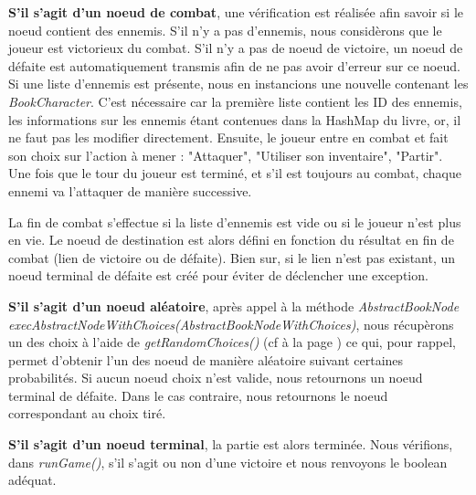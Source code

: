 			\textbf{S'il s'agit d'un noeud de combat}, une vérification est réalisée afin savoir si le noeud contient des ennemis. S'il n'y a pas d'ennemis, nous considèrons que le joueur est victorieux du combat. S'il n'y a pas de noeud de victoire, un noeud de défaite est automatiquement transmis afin de ne pas avoir d'erreur sur ce noeud. Si une liste d'ennemis est présente, nous en instancions une nouvelle contenant les \textit{BookCharacter}. C'est nécessaire car la première liste contient les ID des ennemis, les informations sur les ennemis étant contenues dans la HashMap du livre, or, il ne faut pas les modifier directement. Ensuite, le joueur entre en combat et fait son choix sur l'action à mener : "Attaquer", "Utiliser son inventaire", "Partir". Une fois que le tour du joueur est terminé, et s'il est toujours au combat, chaque ennemi va l'attaquer de manière successive.

			La fin de combat s'effectue si la liste d'ennemis est vide ou si le joueur n'est plus en vie. Le noeud de destination est alors défini en fonction du résultat en fin de combat (lien de victoire ou de défaite). Bien sur, si le lien n'est pas existant, un noeud terminal de défaite est créé pour éviter de déclencher une exception.

			\textbf{S'il s'agit d'un noeud aléatoire}, après appel à la méthode \textit{AbstractBookNode execAbstractNodeWithChoices(AbstractBookNodeWithChoices)}, nous récupèrons un des choix à l'aide de \textit{getRandomChoices()} (cf  à la page \pageref{lst:getRandomChoices}) ce qui, pour rappel, permet d'obtenir l'un des noeud de manière aléatoire suivant certaines probabilités. Si aucun noeud choix n'est valide, nous retournons un noeud terminal de défaite. Dans le cas contraire, nous retournons le noeud correspondant au choix tiré.

			\textbf{S'il s'agit d'un noeud terminal}, la partie est alors terminée. Nous vérifions, dans \textit{runGame()}, s'il s'agit ou non d'une victoire et nous renvoyons le boolean adéquat.
